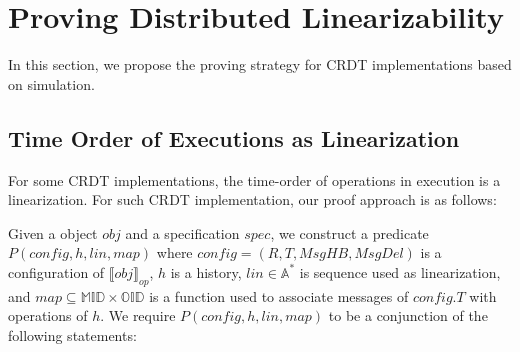 
\section{Proving Distributed Linearizability}
\label{sec:proving distributed linearizability}



In this section, we propose the proving strategy for CRDT implementations based on simulation.



\subsection{Time Order of Executions as Linearization}
\label{subsec:time order of execution as linearization}  

 
For some CRDT implementations, the time-order of operations in execution is a linearization. For such CRDT implementation, our proof approach is as follows: 

Given a object $\mathit{obj}$ and a specification $\mathit{spec}$, we construct a predicate $P(\mathit{config},h,\mathit{lin},\mathit{map})$ where $\mathit{config} = (R,T,\mathit{MsgHB},\mathit{MsgDel})$ is a configuration of $\llbracket \mathit{obj} \rrbracket_{\mathit{op}}$, $h$ is a history, $\mathit{lin} \in \mathbb{A}^*$ is sequence used as linearization, and $\mathit{map} \subseteq \mathbb{MID} \times \mathbb{OID}$ is a function used to associate messages of $\mathit{config}.T$ with operations of $h$. We require $P(\mathit{config},h,\mathit{lin},\mathit{map})$ to be a conjunction of the following statements:

